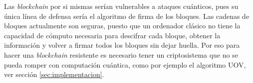 \begin{itemize}
Las \textit{blockchain} por si mismas serían vulnerables a ataques cuánticos, pues su única línea de defensa sería el algoritmo de firma de los bloques. Las cadenas de bloques actualmente son seguras, puesto que un ordenador clásico no tiene la capacidad de cómputo necesaria para descifrar cada bloque, obtener la información y volver a firmar todos los bloques sin dejar huella. Por eso para hacer una \textit{blockchain} resistente es necesario tener un criptosistema que no se pueda romper con computación cuántica, como por ejemplo el algoritmo UOV, ver sección \ref{sec:implementacion}. 

\end{itemize}


